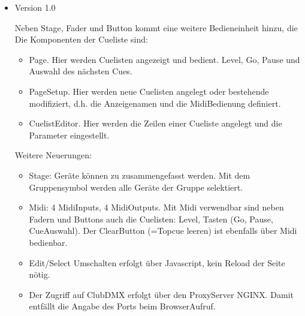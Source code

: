 \documentclass[letterpaper,10pt,ngerman]{sphinxmanual}
\begin{document}
\begin{itemize}
\begin{itemize}
\item {} 
Stage: Geräte\sphinxhyphen{}Fader werden in einem Fenster angezeigt, Selektion kann gemeinsam
verschoben werden.

\item {} 
Stage: In der Config (Bedienelemente) wird eine Default\sphinxhyphen{}Stage angegeben. Die
angezeigte Stage kann davon abweichen: Die angezeigte Stage wird in einer
Session\sphinxhyphen{}Variablen gespeichert.

\end{itemize}

\item {} 
Version 1.0

Neben Stage, Fader und Button kommt eine weitere Bedieneinheit hinzu, die
Die Komponenten der Cueliste sind:
\begin{itemize}
\item {} 
Page. Hier werden Cuelisten angezeigt und bedient. Level, Go, Pause und
Auswahl des nächsten Cues.

\item {} 
Page\sphinxhyphen{}Setup. Hier werden neue Cuelisten angelegt oder bestehende
modifiziert, d.h. die Anzeigenamen und die Midi\sphinxhyphen{}Bedienung definiert.

\item {} 
Cuelist\sphinxhyphen{}Editor. Hier werden die Zeilen einer Cueliste angelegt und die
Parameter eingestellt.

\end{itemize}

Weitere Neuerungen:
\begin{itemize}
\item {} 
Stage: Geräte können zu  zusammengefasst werden. Mit dem
Gruppensymbol werden alle Geräte der Gruppe selektiert.

\item {} 
Midi: 4 Midi\sphinxhyphen{}Inputs, 4 Midi\sphinxhyphen{}Outputs. Mit Midi verwendbar sind neben Fadern
und Buttons auch die Cuelisten: Level, Tasten (Go, Pause, Cue\sphinxhyphen{}Auswahl).
Der Clear\sphinxhyphen{}Button (=Topcue leeren) ist ebenfalls über Midi bedienbar.

\item {} 
Edit/Select Umschalten erfolgt über Javascript, kein Reload der Seite nötig.

\item {} 
Der Zugriff auf ClubDMX erfolgt über den Proxy\sphinxhyphen{}Server NGINX. Damit entfällt
die Angabe des Ports beim Browser\sphinxhyphen{}Aufruf.

\end{itemize}

\end{itemize}
\end{document}
